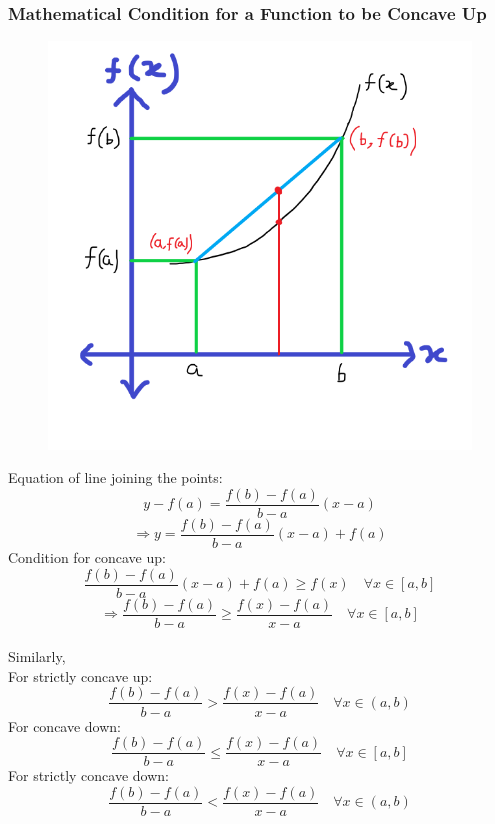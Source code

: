 \documentclass[14]{article}
\theoremstyle{definition}
\theoremstyle{case}
\begin{document}
\subsubsection{Mathematical Condition for a Function to be Concave Up}
\begin{figure}[h]
\includegraphics[scale=0.417]{images/concave_up}
\end{figure}
Equation of line joining the points:
\[y - f(a) = \dfrac{f(b) - f(a)}{b - a} (x-a)\]
\[\Rightarrow y = \dfrac{f(b) - f(a)}{b - a} (x-a) + f(a)\]
Condition for concave up:
\[
\dfrac{f(b) - f(a)}{b - a} (x-a) + f(a) \geq f(x)\quad \forall x \in [a, b]
\]
\[\Rightarrow \dfrac{f(b) - f(a)}{b - a} \geq \dfrac{f(x) - f(a)}{x - a} \quad \forall x \in [a, b]\]\\
\pagebreak
Similarly,\\
For strictly concave up:
\[\dfrac{f(b) - f(a)}{b - a} > \dfrac{f(x) - f(a)}{x - a} \quad \forall x \in (a, b)\]
For concave down:
\[\dfrac{f(b) - f(a)}{b - a} \leq \dfrac{f(x) - f(a)}{x - a} \quad \forall x \in [a, b]\]
For strictly concave down:
\[\dfrac{f(b) - f(a)}{b - a} < \dfrac{f(x) - f(a)}{x - a} \quad \forall x \in (a, b)\]
\end{document}
